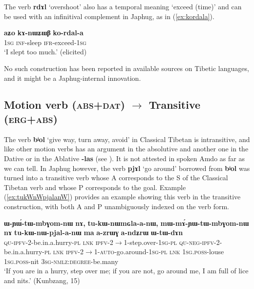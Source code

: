 \documentclass[oneside,a4paper,11pt]{article}
\newcommand{\ipa}[1]{{\phon\textbf{\mbox{#1}}}} %
\newcommand{\refb}[1]{(\ref{#1})}
\begin{document}
The verb \ipa{rdɤl} `overshoot' also has a temporal meaning `exceed (time)' and can be used with an infinitival complement in Japhug, as in \refb{ex:kordala}.

\begin{exe}
\ex \label{ex:kordala}
\gll
\ipa{aʑo}  	\ipa{kɤ-nɯʑɯβ}  	\ipa{ko-rdal-a}  \\
\textsc{1sg} \textsc{inf}-sleep \textsc{ifr}-exceed-\textsc{1sg} \\
\glt `I slept too much.' (elicited)
\end{exe}

No such construction has been reported in available sources on Tibetic languages, and it might be a Japhug-internal innovation.

\subsection{Motion verb (\textsc{abs+dat}) $\rightarrow$ Transitive (\textsc{erg+abs})}  
The verb \ipa{bʲol} `give way, turn away, avoid' in Classical Tibetan is intransitive, and like other motion verbs has an argument in the absolutive and another one in the Dative or in the Ablative \ipa{-las} (see \citealt[268]{hill10dictionary}). It is not attested in spoken Amdo as far as we can tell. In Japhug however, the verb \ipa{pjɤl} `go around' borrowed from  \ipa{bʲol} was turned into a transitive verb whose A corresponds to the S of the Classical Tibetan verb and whose P corresponds to the goal. Example \refb{ex:tukWnWpjalanW} provides an example  showing this verb in the transitive construction, with both A and P unambiguously indexed on the verb form.


\begin{exe}
\ex \label{ex:tukWnWpjalanW}
\gll
\ipa{ɯ-ɲɯ́-tɯ-mbɣom-nɯ}  	\ipa{nɤ,}  	\ipa{tu-kɯ-nɯmɢla-a-nɯ,}  \ipa{mɯ-mɤ́-ɲɯ-tɯ-mbɣom-nɯ}  	\ipa{nɤ}  	\ipa{tu-kɯ-nɯ-pjal-a-nɯ}  	\ipa{ma}  	\ipa{a-zrɯɣ}  	\ipa{a-ndʑrɯ}  	\ipa{ɯ-tɯ-dɤn} \\
\textsc{qu-ipfv}-2-be.in.a.hurry-\textsc{pl} \textsc{lnk} \textsc{ipfv}-2$\rightarrow$1-step.over-\textsc{1sg-pl} \textsc{qu-neg-ipfv}-2-be.in.a.hurry-\textsc{pl} \textsc{lnk} \textsc{ipfv}-2$\rightarrow$1-\textsc{auto}-go.around-\textsc{1sg-pl} \textsc{lnk}   \textsc{1sg.poss}-louse \textsc{1sg.poss}-nit \textsc{3sg-nmlz:degree}-be.many \\
\glt `If you are in a hurry, step over me; if you are not, go around me, I am full of lice and nits.' (Kunbzang, 15)
\end{exe}
\end{document}
